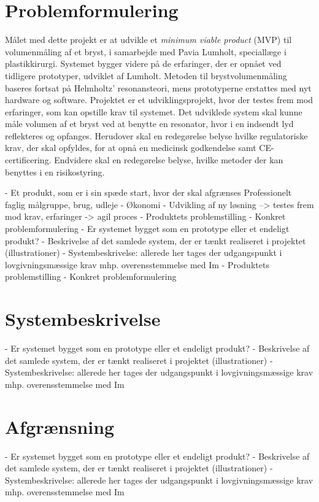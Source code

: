 \section{Problemformulering}
Målet med dette projekt er at udvikle et \textit{minimum viable product} (MVP) til volumenmåling af et bryst, i samarbejde med Pavia Lumholt, speciallæge i plastikkirurgi. Systemet bygger videre på de erfaringer, der er opnået ved tidligere prototyper, udviklet af Lumholt. Metoden til brystvolumenmåling baseres fortsat på Helmholtz' resonansteori, mens prototyperne erstattes med nyt hardware og software. Projektet er et udviklingsprojekt, hvor der testes frem mod erfaringer, som kan opstille krav til systemet. Det udviklede system skal kunne måle volumen af et bryst ved at benytte en resonator, hvor i en indsendt lyd reflekteres og opfanges. Herudover skal en redegørelse belyse hvilke regulatoriske krav, der skal opfyldes, for at opnå en medicinsk godkendelse samt CE-certificering. Endvidere skal en redegørelse belyse, hvilke metoder der kan benyttes i en risikostyring. 
 
- Et produkt, som er i sin spæde start, hvor der skal afgrænses
 Professionelt faglig målgruppe,  brug, udleje 
- Økonomi 
- Udvikling af ny løsning --> testes frem mod krav, erfaringer -> agil proces
- Produktets problemstilling
- Konkret problemformulering
- Er systemet bygget som en prototype eller et endeligt produkt? 
- Beskrivelse af det samlede system, der er tænkt realiseret i projektet (illustrationer)
- Systembeskrivelse: allerede her tages der udgangspunkt i lovgivningsmæssige krav mhp. overensstemmelse med Im 
- Produktets problemstilling
- Konkret problemformulering

\section{Systembeskrivelse}
- Er systemet bygget som en prototype eller et endeligt produkt? 
- Beskrivelse af det samlede system, der er tænkt realiseret i projektet (illustrationer)
- Systembeskrivelse: allerede her tages der udgangspunkt i lovgivningsmæssige krav mhp. overensstemmelse med Im

\section{Afgrænsning}
- Er systemet bygget som en prototype eller et endeligt produkt? 
- Beskrivelse af det samlede system, der er tænkt realiseret i projektet (illustrationer)
- Systembeskrivelse: allerede her tages der udgangspunkt i lovgivningsmæssige krav mhp. overensstemmelse med Im

